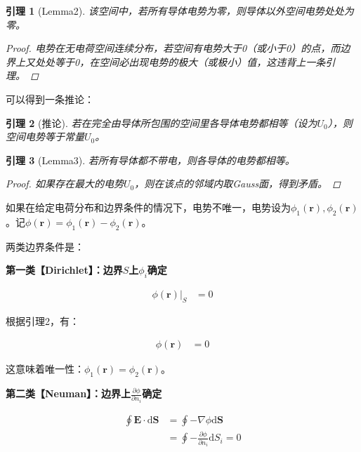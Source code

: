 \documentclass[12pt,onecolumn,a4paper]{book}
\newtheorem*{lemma}{引理}
\numberwithin{table}{subsection}
\numberwithin{equation}{subsection}
\begin{document}
\begin{lemma}[Lemma2]
    该空间中，若所有导体电势为零，则导体以外空间电势处处为零。

    \begin{proof}
        电势在无电荷空间连续分布，若空间有电势大于0（或小于0）的点，而边界上又处处等于0，在空间必出现电势的极大（或极小）值，这违背上一条引理。
    \end{proof}
\end{lemma}

可以得到一条推论：

\begin{lemma}[推论]
    若在完全由导体所包围的空间里各导体电势都相等（设为$U_0$），则空间电势等于常量$U_0$。
\end{lemma}

\begin{lemma}[Lemma3]
    若所有导体都不带电，则各导体的电势都相等。

    \begin{proof}
        如果存在最大的电势$U_0$，则在该点的邻域内取Gauss面，得到矛盾。
    \end{proof}
\end{lemma}

如果在给定电荷分布和边界条件的情况下，电势不唯一，电势设为$\phi_1(\mathbf{r}),\phi_2(\mathbf{r})$。记$\phi(\mathbf{r})=\phi_1(\mathbf{r})-\phi_2(\mathbf{r})$。

两类边界条件是：

\textbf{第一类【Dirichlet】：边界$S$上$\phi_i$确定}

\begin{align}
    \phi(\mathbf{r}) |_S & = 0
\end{align}

根据引理2，有：

\begin{align}
    \phi(\mathbf{r}) & = 0
\end{align}

这意味着唯一性：$\phi_1(\mathbf{r})=\phi_2(\mathbf{r})$。

\textbf{第二类【Neuman】：边界上$\frac{\partial \phi}{\partial n_i}$确定}

\begin{align}
    \oint \mathbf{E} \cdot \mathrm{d} \mathbf{S} & = \oint - \nabla \phi \mathrm{d} \mathbf{S}                     \\
                                                 & = \oint - \frac{\partial \phi}{\partial n_i} \mathrm{d} S_i = 0
\end{align}
\end{document}

